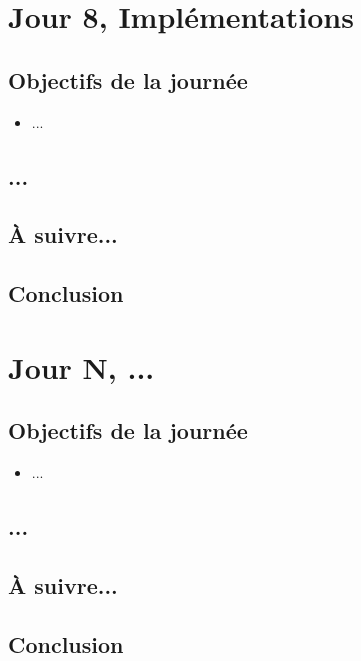 \documentclass[a4paper,11pt]{article}
\begin{document}
\newpage


\section{Jour 8, Implémentations}
\subsection{Objectifs de la journée}
\begin{itemize}
    \item ...
\end{itemize}
\subsection{...}
\subsection{À suivre...}
\subsection{Conclusion}
\newpage


\section{Jour N, ...}
\subsection{Objectifs de la journée}
\begin{itemize}
    \item ...
\end{itemize}
\subsection{...}
\subsection{À suivre...}
\subsection{Conclusion}
\newpage

\end{document}
